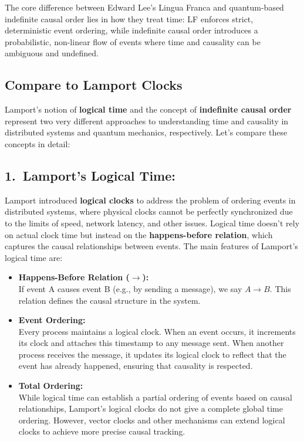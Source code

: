 The core difference between Edward Lee’s Lingua Franca and quantum-based indefinite causal order lies in how they treat time: LF enforces strict, deterministic event ordering, while indefinite causal order introduces a probabilistic, non-linear flow of events where time and causality can be ambiguous and undefined.

\subsection{Compare to Lamport Clocks}

Lamport’s notion of \textbf{logical time} and the concept of \textbf{indefinite causal order} represent two very different approaches to understanding time and causality in distributed systems and quantum mechanics, respectively. Let's compare these concepts in detail:

\subsection*{1.\ Lamport’s Logical Time:}

Lamport introduced \textbf{logical clocks} to address the problem of ordering events in distributed systems, where physical clocks cannot be perfectly synchronized due to the limits of speed, network latency, and other issues. Logical time doesn't rely on actual clock time but instead on the \textbf{happens-before relation}, which captures the causal relationships between events. The main features of Lamport’s logical time are:

\begin{itemize}[leftmargin=1.5em]
\item \textbf{Happens-Before Relation (\(\rightarrow\)):}\\
  If event A causes event B (e.g., by sending a message), we say \(A \rightarrow B\). This relation defines the causal structure in the system.
\item \textbf{Event Ordering:}\\
  Every process maintains a logical clock. When an event occurs, it increments its clock and attaches this timestamp to any message sent. When another process receives the message, it updates its logical clock to reflect that the event has already happened, ensuring that causality is respected.
\item \textbf{Total Ordering:}\\
  While logical time can establish a partial ordering of events based on causal relationships, Lamport’s logical clocks do not give a complete global time ordering. However, vector clocks and other mechanisms can extend logical clocks to achieve more precise causal tracking.
\end{itemize}

